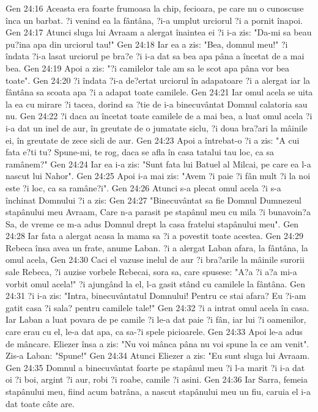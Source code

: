 Gen 24:16  Aceasta era foarte frumoasa la chip, fecioara, pe care nu o cunoscuse înca un barbat. ?i venind ea la fântâna, ?i-a umplut urciorul ?i a pornit înapoi.
Gen 24:17  Atunci sluga lui Avraam a alergat înaintea ei ?i i-a zis: "Da-mi sa beau pu?ina apa din urciorul tau!"
Gen 24:18  Iar ea a zis: "Bea, domnul meu!" ?i îndata ?i-a lasat urciorul pe bra?e ?i i-a dat sa bea apa pâna a încetat de a mai bea.
Gen 24:19  Apoi a zis: "?i camilelor tale am sa le scot apa pâna vor bea toate".
Gen 24:20  ?i îndata ?i-a de?ertat urciorul în adapatoare ?i a alergat iar la fântâna sa scoata apa ?i a adapat toate camilele.
Gen 24:21  Iar omul acela se uita la ea cu mirare ?i tacea, dorind sa ?tie de i-a binecuvântat Domnul calatoria sau nu.
Gen 24:22  ?i daca au încetat toate camilele de a mai bea, a luat omul acela ?i i-a dat un inel de aur, în greutate de o jumatate siclu, ?i doua bra?ari la mâinile ei, în greutate de zece sicli de aur.
Gen 24:23  Apoi a întrebat-o ?i a zis: "A cui fata e?ti tu? Spune-mi, te rog, daca se afla în casa tatalui tau loc, ca sa ramânem?"
Gen 24:24  Iar ea i-a zis: "Sunt fata lui Batuel al Milcai, pe care ea l-a nascut lui Nahor".
Gen 24:25  Apoi i-a mai zis: "Avem ?i paie ?i fân mult ?i la noi este ?i loc, ca sa ramâne?i".
Gen 24:26  Atunci s-a plecat omul acela ?i s-a închinat Domnului ?i a zis:
Gen 24:27  "Binecuvântat sa fie Domnul Dumnezeul stapânului meu Avraam, Care n-a parasit pe stapânul meu cu mila ?i bunavoin?a Sa, de vreme ce m-a adus Domnul drept la casa fratelui stapânului meu".
Gen 24:28  Iar fata a alergat acasa la mama sa ?i a povestit toate acestea.
Gen 24:29  Rebeca însa avea un frate, anume Laban. ?i a alergat Laban afara, la fântâna, la omul acela,
Gen 24:30  Caci el vazuse inelul de aur ?i bra?arile la mâinile surorii sale Rebeca, ?i auzise vorbele Rebecai, sora sa, care spusese: "A?a ?i a?a mi-a vorbit omul acela!" ?i ajungând la el, l-a gasit stând cu camilele la fântâna.
Gen 24:31  ?i i-a zis: "Intra, binecuvântatul Domnului! Pentru ce stai afara? Eu ?i-am gatit casa ?i sala? pentru camilele tale!"
Gen 24:32  ?i a intrat omul acela în casa. Iar Laban a luat povara de pe camile ?i le-a dat paie ?i fân, iar lui ?i oamenilor, care erau cu el, le-a dat apa, ca sa-?i spele picioarele.
Gen 24:33  Apoi le-a adus de mâncare. Eliezer însa a zis: "Nu voi mânca pâna nu voi spune la ce am venit". Zis-a Laban: "Spune!"
Gen 24:34  Atunci Eliezer a zis: "Eu sunt sluga lui Avraam.
Gen 24:35  Domnul a binecuvântat foarte pe stapânul meu ?i l-a marit ?i i-a dat oi ?i boi, argint ?i aur, robi ?i roabe, camile ?i asini.
Gen 24:36  Iar Sarra, femeia stapânului meu, fiind acum batrâna, a nascut stapânului meu un fiu, caruia el i-a dat toate câte are.
